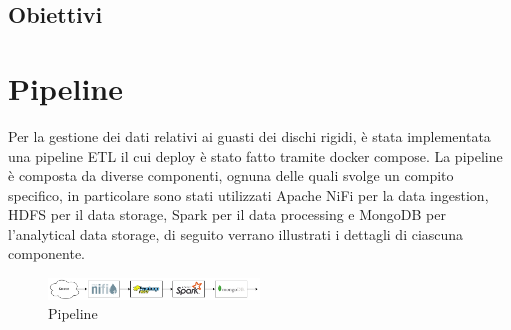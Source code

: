 \documentclass[conference]{IEEEtran}
\begin{document}
\subsection{Obiettivi}
\section{Pipeline}
Per la gestione dei dati relativi ai guasti dei dischi rigidi, è stata implementata una pipeline ETL il cui deploy è stato fatto tramite docker compose. La pipeline è composta da diverse componenti, ognuna delle quali svolge un compito specifico, in particolare sono stati utilizzati Apache NiFi per la data ingestion, HDFS per il data storage, Spark per il data processing e MongoDB per l'analytical data storage, di seguito verrano illustrati i dettagli di ciascuna componente.
\begin{figure}[H]
    \centering
    \includegraphics[width=0.5\textwidth]{./res/pipeline_2.png}
    \caption{Pipeline}
    \label{fig:pipeline}
\end{figure} 
\end{document}
